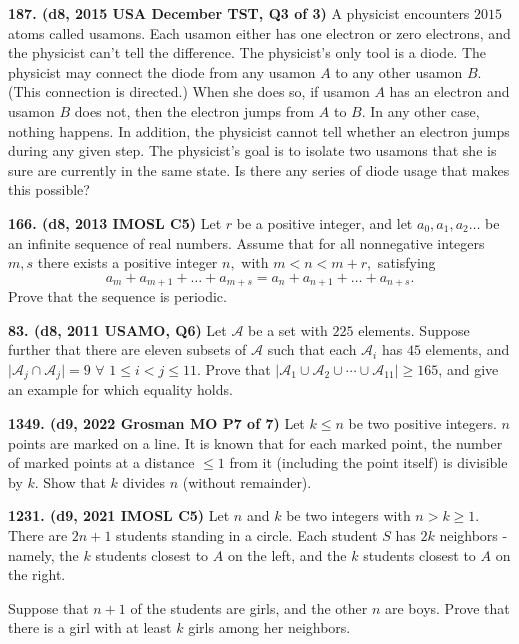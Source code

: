 \documentclass{article}
\begin{document}
\textbf{187. (\color{red}d8\color{black}, 2015 USA December TST, Q3 of 3)} A physicist encounters $2015$ atoms called usamons. Each usamon either has one electron or zero electrons, and the physicist can't tell the difference. The physicist's only tool is a diode. The physicist may connect the diode from any usamon $A$ to any other usamon $B$. (This connection is directed.) When she does so, if usamon $A$ has an electron and usamon $B$ does not, then the electron jumps from $A$ to $B$. In any other case, nothing happens. In addition, the physicist cannot tell whether an electron jumps during any given step. The physicist's goal is to isolate two usamons that she is sure are currently in the same state. Is there any series of diode usage that makes this possible?

\textbf{166. (\color{red}d8\color{black}, 2013 IMOSL C5)} Let $r$ be a positive integer, and let $a_{0}, a_{1}, a_{2} \dots$ be an infinite sequence of real numbers. Assume that for all nonnegative integers $m, s$ there exists a positive integer $n,$ with $m < n < m + r,$ satisfying $$a_{m} + a_{m + 1} + \dots + a_{m + s} = a_{n} + a_{n + 1} + \dots + a_{n + s}.$$ Prove that the sequence is periodic.

\textbf{83. (\color{red}d8\color{black}, 2011 USAMO, Q6)} Let $\mathcal{A}$ be a set with $225$ elements. Suppose further that there are eleven subsets of $\mathcal{A}$ such that each $\mathcal{A}_i$ has $45$ elements, and $\vert \mathcal{A}_j \cap \mathcal{A}_j \vert = 9 $ $\forall$ $ 1 \leq i < j \leq 11$. Prove that $\vert \mathcal{A}_1 \cup \mathcal{A}_2 \cup\cdots \cup \mathcal{A}_{11} \vert \geq 165$, and give an example for which equality holds.

\textbf{1349. (\color{red}d9\color{black}, 2022 Grosman MO P7 of 7)} Let $k\leq n$ be two positive integers. $n$ points are marked on a line. It is known that for each marked point, the number of marked points at a distance $\leq 1$ from it (including the point itself) is divisible by $k$.
Show that $k$ divides $n$ (without remainder).

\textbf{1231. (\color{red}d9\color{black}, 2021 IMOSL C5)} Let $n$ and $k$ be two integers with $n>k\geq 1$. There are $2n+1$ students standing in a circle. Each student $S$ has $2k$ neighbors - namely, the $k$ students closest to $A$ on the left, and the $k$ students closest to $A$ on the right.

Suppose that $n+1$ of the students are girls, and the other $n$ are boys. Prove that there is a girl with at least $k$ girls among her neighbors.
\end{document}
